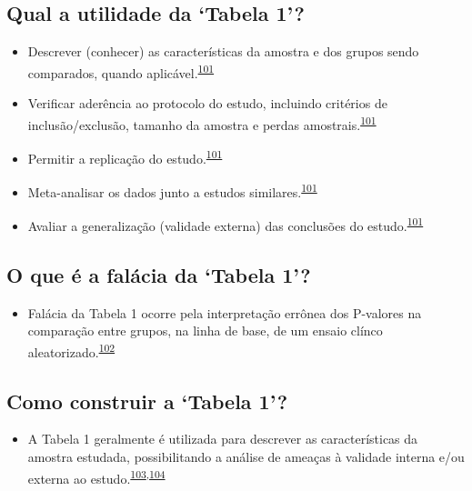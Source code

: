 \documentclass[
  a4paper,
]{book}
\providecommand{\tightlist}{%
  \setlength{\itemsep}{0pt}\setlength{\parskip}{0pt}}
\begin{document}
\hypertarget{qual-a-utilidade-da-tabela-1}{%
\subsection{Qual a utilidade da `Tabela 1'?}\label{qual-a-utilidade-da-tabela-1}}

\begin{itemize}
\item
  Descrever (conhecer) as características da amostra e dos grupos sendo comparados, quando aplicável.\textsuperscript{\protect\hyperlink{ref-chen2020}{101}}
\item
  Verificar aderência ao protocolo do estudo, incluindo critérios de inclusão/exclusão, tamanho da amostra e perdas amostrais.\textsuperscript{\protect\hyperlink{ref-chen2020}{101}}
\item
  Permitir a replicação do estudo.\textsuperscript{\protect\hyperlink{ref-chen2020}{101}}
\item
  Meta-analisar os dados junto a estudos similares.\textsuperscript{\protect\hyperlink{ref-chen2020}{101}}
\item
  Avaliar a generalização (validade externa) das conclusões do estudo.\textsuperscript{\protect\hyperlink{ref-chen2020}{101}}
\end{itemize}

\hypertarget{o-que-uxe9-a-faluxe1cia-da-tabela-1}{%
\subsection{O que é a falácia da `Tabela 1'?}\label{o-que-uxe9-a-faluxe1cia-da-tabela-1}}

\begin{itemize}
\tightlist
\item
  Falácia da Tabela 1 ocorre pela interpretação errônea dos P-valores na comparação entre grupos, na linha de base, de um ensaio clínco aleatorizado.\textsuperscript{\protect\hyperlink{ref-pijls2022}{102}}
\end{itemize}

\hypertarget{como-construir-a-tabela-1}{%
\subsection{Como construir a `Tabela 1'?}\label{como-construir-a-tabela-1}}

\begin{itemize}
\tightlist
\item
  A Tabela 1 geralmente é utilizada para descrever as características da amostra estudada, possibilitando a análise de ameaças à validade interna e/ou externa ao estudo.\textsuperscript{\protect\hyperlink{ref-greenhalgh1997}{103},\protect\hyperlink{ref-Hayes-Larson2019}{104}}
\end{itemize}
\end{document}
